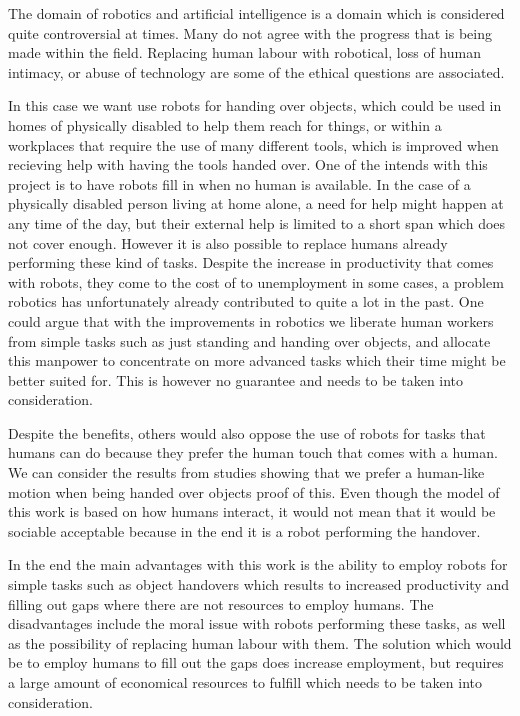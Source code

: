 The domain of robotics and artificial intelligence is a domain which is considered quite controversial at times. Many do not agree with the progress that is being made within the field. Replacing human labour with robotical, loss of human intimacy, or abuse of technology are some of the ethical questions are associated.

In this case we want use robots for handing over objects, which could be used in homes of physically disabled to help them reach for things, or within a workplaces that require the use of many different tools, which is improved when recieving help with having the tools handed over. One of the intends with this project is to have robots fill in when no human is available. In the case of a physically disabled person living at home alone, a need for help might happen at any time of the day, but their external help is limited to a short span which does not cover enough. However it is also possible to replace humans already performing these kind of tasks. Despite the increase in productivity that comes with robots, they come to the cost of to unemployment in some cases, a problem robotics has unfortunately already contributed to quite a lot in the past. One could argue that with the improvements in robotics we liberate human workers from simple tasks such as just standing and handing over objects, and allocate this manpower to concentrate on more advanced tasks which their time might be better suited for. This is however no guarantee and needs to be taken into consideration.

Despite the benefits, others would also oppose the use of robots for tasks that humans can do because they prefer the human touch that comes with a human. We can consider the results from studies showing that we prefer a human-like motion when being handed over objects proof of this. Even though the model of this work is based on how humans interact, it would not mean that it would be sociable acceptable because in the end it is a robot performing the handover.

In the end the main advantages with this work is the ability to employ robots for simple tasks such as object handovers which results to increased productivity and filling out gaps where there are not resources to employ humans. The disadvantages include the moral issue with robots performing these tasks, as well as the possibility of replacing human labour with them. The solution which would be to employ humans to fill out the gaps does increase employment, but requires a large amount of economical resources to fulfill which needs to be taken into consideration.



